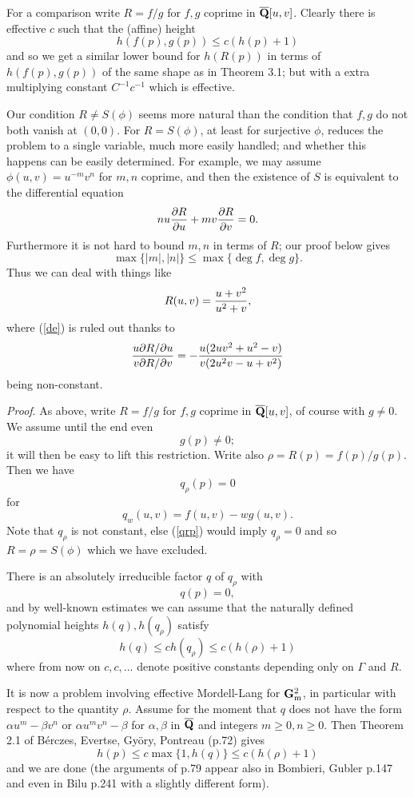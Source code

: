 \documentclass[leqno,12pt]{article} %
\theoremstyle{plain} %
\theoremstyle{definition} %
\begin{document}
For a comparison write $R = f/g$ for $f,g$ coprime in $\overline{\bf Q}[u,v]$. Clearly there is effective
$c$ such that the (affine) height
$$h(f(p),g(p)) \leq c(h(p) + 1)$$
and so we get a similar lower bound for $h(R(p))$ in terms of $h(f(p),g(p))$ of the same shape
as in Theorem 3.1; but with a extra multiplying constant $C^{-1}c^{-1}$ which is effective.

Our condition $R \neq  S(\phi)$ seems more natural than the condition that $f,g$ do not both
vanish at $(0,0)$. For $R = S(\phi)$, at least for surjective $\phi$, reduces the problem to a single
variable, much more easily handled; and whether this happens can be easily determined.
For example, we may assume $\phi(u,v) = u^{-m}v^n$ for $m,n$ coprime, and then the existence of
$S$ is equivalent to the differential equation
\begin{equation}\label{de}
nu{\partial R \over \partial u} + mv{\partial R \over \partial v}=0. 
\end{equation}
Furthermore it is not hard to bound $m,n$ in terms of $R$; our proof below gives
$$\max\{|m|,|n|\} \leq \max\{\deg f,\deg g\}.$$
Thus we can deal with things like
$$R(u,v) = {u + v^2 \over u^2 + v},$$
where (\ref{de}) is ruled out thanks to
$${u\partial R/\partial u \over v\partial R/\partial v}=-{u(2uv^2 + u^2- v) \over v(2u^2v-u + v^2)}$$
being non-constant.

\noindent
{\it Proof}. As above, write $R = f/g$ for $f,g$ coprime in $\overline{\bf Q}[u,v]$, of course with $g \neq 0$. We assume until the end even
\begin{equation}\label{gp}
g(p) \neq  0;
\end{equation}
it will then be easy to lift this restriction. Write also $\rho= R(p) = f(p)/g(p)$. Then we have
\begin{equation}\label{qrp}
q_\rho(p) = 0
\end{equation}
for
$$q_w(u,v) = f(u,v)-wg(u,v).$$
Note that $q_\rho$ is not constant, else (\ref{qrp}) would imply $q_\rho= 0$ and so $R = \rho= S(\phi)$ which we have excluded.

There is an absolutely irreducible factor $q$ of $q_\rho$ with 
$$q(p) = 0,$$
and by well-known estimates we can assume that the naturally defined polynomial heights $h(q),h(q_\rho)$
satisfy
$$h(q) \leq ch(q_\rho) \leq c(h(\rho) + 1)$$
where from now on $c,c,...$ denote positive constants depending only on $\Gamma$ and $R$.

It is now a problem involving effective Mordell-Lang for ${\bf G}_{\rm m}^2$, in particular with respect
to the quantity $\rho$. Assume for the moment that $q$ does not have the form $\alpha u^m-\beta v^n$ or $\alpha u^mv^n-\beta$ for $\alpha,\beta$ in $\overline{\bf Q}$ and integers $m \geq 0, n \geq 0$. Then Theorem 2.1 of B\'erczes, Evertse, Gy\"ory, Pontreau \cite{BEGP} (p.72) gives 
$$h(p) \leq  c\max\{1,h(q)\} \leq c(h(\rho) + 1)$$
and we are done (the arguments of \cite{BEGP} p.79 appear also in Bombieri, Gubler \cite{BG} p.147 and even in Bilu \cite{Bilu} p.241 with a slightly different form).
\end{document}
